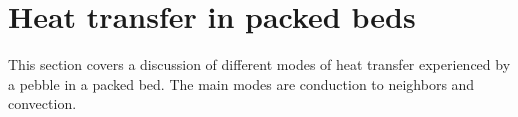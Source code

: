 \chapter{Heat transfer in packed beds} \label{ch:modeling-heat-transfer}
This section covers a discussion of different modes of heat transfer experienced by a pebble in a packed bed. The main modes are conduction to neighbors and convection.




